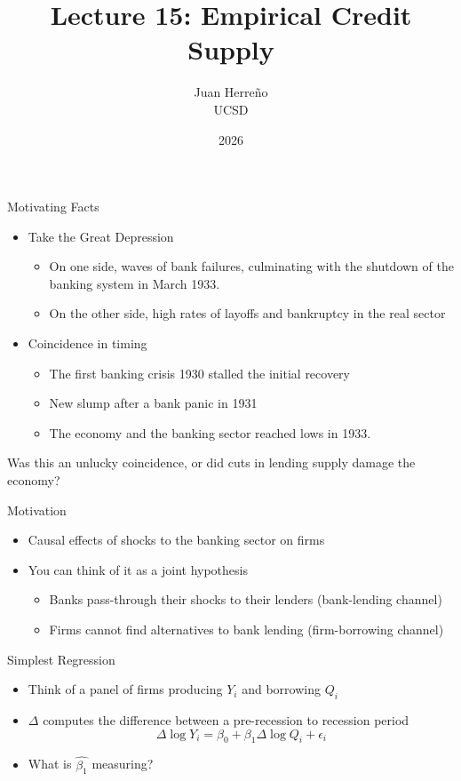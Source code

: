 \documentclass[11pt,aspectratio=169,xcolor={dvipsnames},hyperref={pdftex,pdfpagemode=UseNone,hidelinks,pdfdisplaydoctitle=true},usepdftitle=false]{beamer}
\title{Lecture 15: Empirical Credit Supply}
\author{Juan Herre\~{n}o\\UCSD}
\date{2026}
\begin{document}
\maketitle


\begin{frame}{Motivating Facts}
\begin{itemize}
\item Take the Great Depression
\begin{itemize}
\item On one side, waves of bank failures, culminating with the shutdown of the banking system in March 1933.
\item On the other side, high rates of layoffs and bankruptcy in the real sector
\end{itemize}
\item Coincidence in timing
\begin{itemize}
\item The first banking crisis 1930 stalled the initial recovery
\item New slump after a bank panic in 1931
\item The economy and the banking sector reached lows in 1933.
\end{itemize}
\end{itemize}
Was this an unlucky coincidence, or did cuts in lending supply damage the economy?
\end{frame}

\begin{frame}{Motivation}
\begin{itemize}
\item Causal effects of shocks to the banking sector on firms
\item You can think of it as a joint hypothesis
\begin{itemize}
\item Banks pass-through their shocks to their lenders (bank-lending channel)
\item Firms cannot find alternatives to bank lending (firm-borrowing channel)
\end{itemize}
\end{itemize}
\end{frame}


\begin{frame}{Simplest Regression}
\begin{itemize}
\item Think of a panel of firms producing $Y_i$ and borrowing $Q_i$
\item $\Delta$ computes the difference between a pre-recession to recession period
\[\Delta \log Y_i = \beta_0 + \beta_1 \Delta \log Q_i + \epsilon_i\]
\item What is $\hat{\beta_1}$ measuring?
\end{itemize}
\end{frame}
\end{document}
